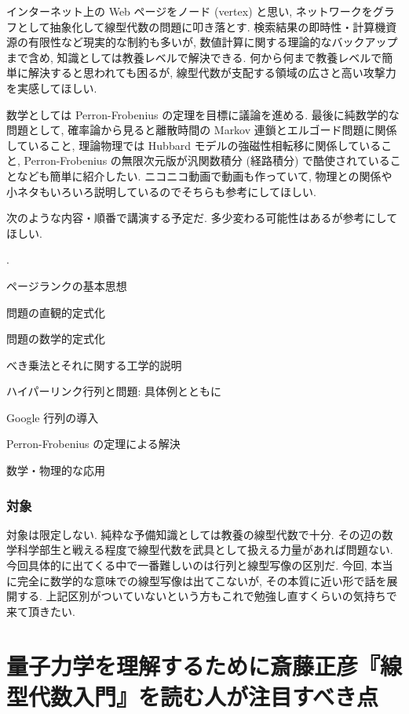 \documentclass[openany, a4paper, oneside]{jsbook}
\newcounter{enum2}
\renewenvironment{enumerate}{%
\begin{list}%
{%
\arabic{enum2}.\ \,%
}%
{%
\usecounter{enum2}
\setlength{\itemindent}{0pt}%
\setlength{\leftmargin}{15pt}%
\setlength{\rightmargin}{0pt}%
\setlength{\labelsep}{0pt}%
\setlength{\labelwidth}{6pt}%
\setlength{\itemsep}{0pt}%
\setlength{\parsep}{0pt}%
\setlength{\listparindent}{0pt}%
}
}{%
\end{list}%
}
\theoremstyle{break}
\theoremstyle{breakdefn}
\begin{document}
インターネット上の Web ページをノード (vertex) と思い,
ネットワークをグラフとして抽象化して線型代数の問題に叩き落とす.
検索結果の即時性・計算機資源の有限性など現実的な制約も多いが,
数値計算に関する理論的なバックアップまで含め, 知識としては教養レベルで解決できる.
何から何まで教養レベルで簡単に解決すると思われても困るが,
線型代数が支配する領域の広さと高い攻撃力を実感してほしい.

数学としては Perron-Frobenius の定理を目標に議論を進める.
最後に純数学的な問題として, 確率論から見ると離散時間の Markov 連鎖とエルゴード問題に関係していること\cite[7 節]{TadahisaFunaki1},
理論物理では Hubbard モデルの強磁性相転移に関係していること\cite{HalTasaki5},
Perron-Frobenius の無限次元版が汎関数積分 (経路積分) で酷使されていること\cite{LorincziHiroshimaBetz1}なども簡単に紹介したい.
ニコニコ動画で動画\cite{phasetr3}も作っていて,
物理との関係や小ネタもいろいろ説明しているのでそちらも参考にしてほしい.

次のような内容・順番で講演する予定だ.
多少変わる可能性はあるが参考にしてほしい.
\begin{enumerate}
\item ページランクの基本思想
\item 問題の直観的定式化
\item 問題の数学的定式化
\item べき乗法とそれに関する工学的説明
\item ハイパーリンク行列と問題: 具体例とともに
\item Google 行列の導入
\item Perron-Frobenius の定理による解決
\item 数学・物理的な応用
\end{enumerate}
\subsection{対象}


対象は限定しない.
純粋な予備知識としては教養の線型代数で十分.
その辺の数学科学部生と戦える程度で線型代数を武具として扱える力量があれば問題ない.
今回具体的に出てくる中で一番難しいのは行列と線型写像の区別だ.
今回, 本当に完全に数学的な意味での線型写像は出てこないが, その本質に近い形で話を展開する.
上記区別がついていないという方もこれで勉強し直すくらいの気持ちで来て頂きたい.
\chapter{量子力学を理解するために斎藤正彦『線型代数入門』\cite{MasahikoSaitoh1}を読む人が注目すべき点}
\end{document}
